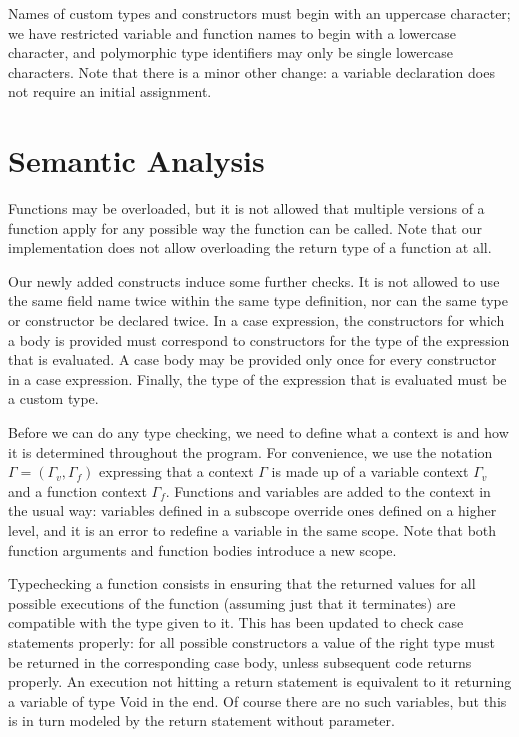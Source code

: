 \documentclass[a4paper]{article}
\begin{document}
Names of custom types and constructors must begin with an uppercase character; we have restricted variable and function names to begin with a lowercase character, and polymorphic type identifiers may only be single lowercase characters.
Note that there is a minor other change: a variable declaration does not require an initial assignment.

\section{Semantic Analysis}

Functions may be overloaded, but it is not allowed that multiple versions of a function apply for any possible way the function can be called.
Note that our implementation does not allow overloading the return type of a function at all.

Our newly added constructs induce some further checks.
It is not allowed to use the same field name twice within the same type definition, nor can the same type or constructor be declared twice.
In a case expression, the constructors for which a body is provided must correspond to constructors for the type of the expression that is evaluated.
A case body may be provided only once for every constructor in a case expression.
Finally, the type of the expression that is evaluated must be a custom type.

Before we can do any type checking, we need to define what a context is and how it is determined throughout the program.
For convenience, we use the notation $\Gamma = (\Gamma_v, \Gamma_f)$ expressing that a context $\Gamma$ is made up of a variable context $\Gamma_v$ and a function context $\Gamma_f$.
Functions and variables are added to the context in the usual way: variables defined in a subscope override ones defined on a higher level, and it is an error to redefine a variable in the same scope.
Note that both function arguments and function bodies introduce a new scope.

Typechecking a function consists in ensuring that the returned values for all possible executions of the function (assuming just that it terminates) are compatible with the type given to it.
This has been updated to check case statements properly: for all possible constructors a value of the right type must be returned in the corresponding case body, unless subsequent code returns properly.
An execution not hitting a return statement is equivalent to it returning a variable of type Void in the end.
Of course there are no such variables, but this is in turn modeled by the return statement without parameter.
\end{document}
